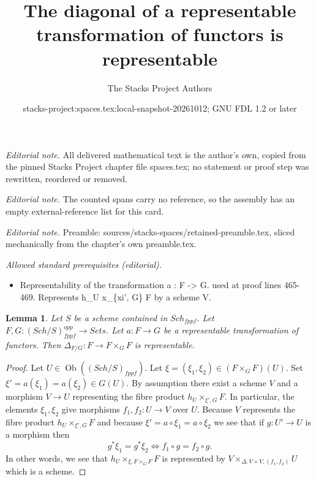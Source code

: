 \documentclass[10pt,a4paper]{amsart}
\title{The diagonal of a representable transformation of functors is representable}
\author{The Stacks Project Authors}
\date{stacks-project:spaces.tex:local-snapshot-20261012; GNU FDL 1.2 or later}
\theoremstyle{plain}
\newtheorem{lemma}[subsection]{Lemma}
\theoremstyle{definition}
\theoremstyle{remark}
\numberwithin{equation}{subsection}
\def\Sch{\mathit{Sch}}
\def\Ob{\mathop{\mathrm{Ob}}\nolimits}
\begin{document}
\maketitle
\setcounter{subsection}{1}
\noindent\textit{Editorial note.} All delivered mathematical text is the author's own, copied from the pinned Stacks Project chapter file spaces.tex; no statement or proof step was rewritten, reordered or removed.\par\medskip
\noindent\textit{Editorial note.} The counted spans carry no reference, so the assembly has an empty external-reference list for this card.\par\medskip
\noindent\textit{Editorial note.} Preamble: sources/stacks-spaces/retained-preamble.tex, sliced mechanically from the chapter's own preamble.tex.\par\medskip
\noindent\textit{Allowed standard prerequisites (editorial).}\begin{itemize}
\item Representability of the transformation a : F -> G. used at proof lines 465-469. Represents h\_U x\_\{xi', G\} F by a scheme V.
\end{itemize}\medskip
\begin{lemma}
\label{lemma-representable-transformation-diagonal}
Let $S$ be a scheme contained in $\Sch_{fppf}$.
Let $F, G : (\Sch/S)_{fppf}^{opp} \to \textit{Sets}$.
Let $a : F \to G$ be a representable transformation of functors.
Then $\Delta_{F/G} : F \to F \times_G F$ is representable.
\end{lemma}

\begin{proof}
Let $U \in \Ob((\Sch/S)_{fppf})$. Let
$\xi = (\xi_1, \xi_2) \in (F \times_G F)(U)$.
Set $\xi' = a(\xi_1) = a(\xi_2) \in G(U)$.
By assumption there exist a scheme $V$ and a morphism $V \to U$
representing the fibre product $h_U \times_{\xi', G} F$.
In particular, the elements $\xi_1, \xi_2$ give morphisms
$f_1, f_2 : U \to V$ over $U$. Because $V$ represents the
fibre product $h_U \times_{\xi', G} F$ and because
$\xi' = a \circ \xi_1 = a \circ \xi_2$
we see that if $g : U' \to U$ is a morphism then
$$
g^*\xi_1 = g^*\xi_2
\Leftrightarrow
f_1 \circ g = f_2 \circ g.
$$
In other words, we see that $h_U \times_{\xi, F \times_G F} F$
is represented by $V \times_{\Delta, V \times V, (f_1, f_2)} U$
which is a scheme.
\end{proof}
\end{document}
